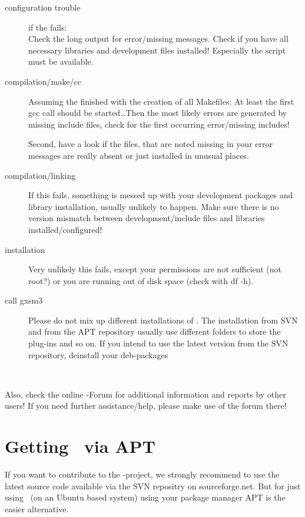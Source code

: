 \begin{description}
\item[configuration trouble] if the  fails:\\
 Check the long output for error/missing messages. Check if you have all
necessary libraries and development files installed! Especially the
 script must be available.

\item[compilation/make/cc] Assuming the  finished with
the creation of all Makefiles: At least the first gcc call should be
started\dots Then the most likely errors are generated by missing include
files, check for the first occurring error/missing includes!

Second, have a look if the files, that are noted missing in your error messages
are really absent or just installed in unusual places.

\item[compilation/linking] If this fails, something is messed up with your
development packages and library installation, usually unlikely to happen. Make
sure there is no version mismatch between development/include files and
libraries installed/configured!

\item[installation] Very unlikely this fails, except your permissions are not
sufficient (not root?) or you are running out of disk space (check with df -h).

\item[call gxsm3] Please do not mix up different installations of \Gxsm. The
installation from SVN and from the APT repository usually use
different folders to store the plug-ins and so on. If you intend to use the
latest version from the SVN repository, deinstall your deb-packages

\\[1mm]
\end{description}

Also, check the online \Gxsm-Forum
 for additional information
and reports by other users! If you need further assistance/help, please make
use of the  forum there!

\section{Getting \Gxsm\ via APT}
If you want to contribute to the \Gxsm-project, we strongly recommend to use
the latest source code available via the SVN repositry on sourceforge.net. But
for just using \Gxsm\ (on an Ubuntu based system) using your package manager
APT is the easier alternative.

